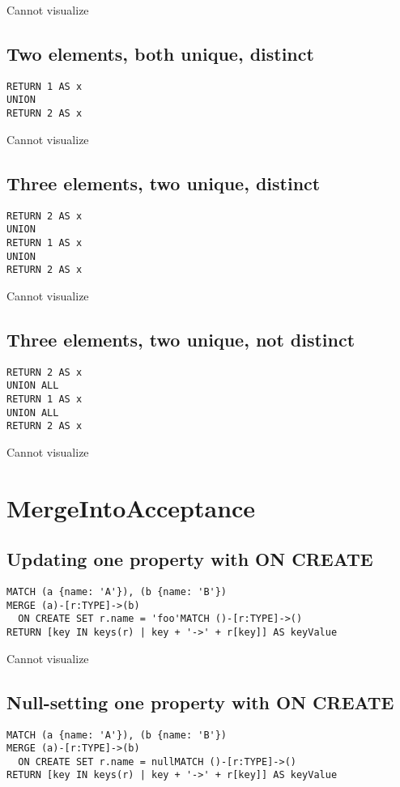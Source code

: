Cannot visualize
\subsection{Two elements, both unique, distinct}

\begin{lstlisting}
RETURN 1 AS x
UNION
RETURN 2 AS x
\end{lstlisting}

Cannot visualize
\subsection{Three elements, two unique, distinct}

\begin{lstlisting}
RETURN 2 AS x
UNION
RETURN 1 AS x
UNION
RETURN 2 AS x
\end{lstlisting}

Cannot visualize
\subsection{Three elements, two unique, not distinct}

\begin{lstlisting}
RETURN 2 AS x
UNION ALL
RETURN 1 AS x
UNION ALL
RETURN 2 AS x
\end{lstlisting}

Cannot visualize
\section{MergeIntoAcceptance}

\subsection{Updating one property with ON CREATE}

\begin{lstlisting}
MATCH (a {name: 'A'}), (b {name: 'B'})
MERGE (a)-[r:TYPE]->(b)
  ON CREATE SET r.name = 'foo'MATCH ()-[r:TYPE]->()
RETURN [key IN keys(r) | key + '->' + r[key]] AS keyValue
\end{lstlisting}

Cannot visualize
\subsection{Null-setting one property with ON CREATE}

\begin{lstlisting}
MATCH (a {name: 'A'}), (b {name: 'B'})
MERGE (a)-[r:TYPE]->(b)
  ON CREATE SET r.name = nullMATCH ()-[r:TYPE]->()
RETURN [key IN keys(r) | key + '->' + r[key]] AS keyValue
\end{lstlisting}


